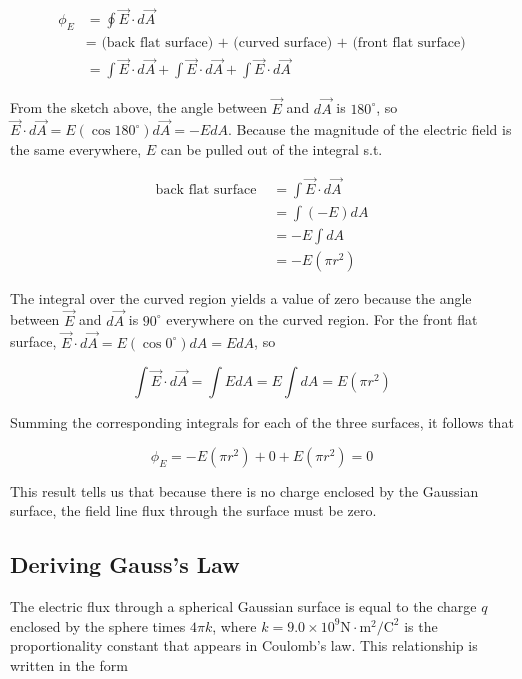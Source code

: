         \begin{align*}
            \phi_E &= \oint \vec{E}\cdot d\vec{A} \\
                   &= \text{ (back flat surface) + (curved surface) + (front flat surface)} \\
                   &= \int \vec{E}\cdot d\vec{A} + \int \vec{E} \cdot d\vec{A} + \int \vec{E}\cdot d\vec{A}
        \end{align*}

        From the sketch above, the angle between $\vec{E}$ and $d\vec{A}$ is $180^{\circ}$, so $\vec{E}\cdot d\vec{A} = E(\cos{180^{\circ}})d\vec{A} = -EdA$. Because the magnitude of the electric field is the same
        everywhere, $E$ can be pulled out of the integral s.t.

        \begin{align*}
            \text{back flat surface }   &= \int \vec{E}\cdot d\vec{A} \\
                                        &= \int (-E)dA \\
                                        &= -E \int dA \\
                                        &= -E(\pi r^2)
        \end{align*}

        The integral over the curved region yields a value of zero because the angle between $\vec{E}$ and $d\vec{A}$ is $90^{\circ}$ everywhere on the curved region. For the front flat surface,
        $\vec{E}\cdot d\vec{A} = E(\cos{0^{\circ}})dA = EdA$, so

        \[
            \int \vec{E}\cdot d\vec{A} = \int EdA = E\int dA = E(\pi r^2)
        \]

        Summing the corresponding integrals for each of the three surfaces, it follows that

        \[
            \phi_E = -E(\pi r^2) + 0 + E(\pi r^2) = 0
        \]

        This result tells us that because there is no charge enclosed by the Gaussian surface, the field line flux through the surface must be zero.

    \subsection{Deriving Gauss's Law}   %

        The electric flux through a spherical Gaussian surface is equal to the charge $q$ enclosed by the sphere times $4\pi k$, where $k = 9.0\times 10^9 \text{N}\cdot\text{m}^2 / \text{C}^2$ is the proportionality
        constant that appears in Coulomb's law. This relationship is written in the form

